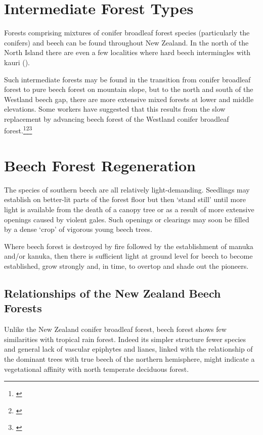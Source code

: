 \section{Intermediate Forest Types}

Forests comprising mixtures of conifer broadleaf forest species (particularly the conifers) and beech can be found throughout New Zealand.
In the north of the North Island there are even a few localities where hard beech intermingles with kauri ().

Such intermediate forests may be found in the transition from conifer broadleaf forest to pure beech forest on mountain slope, but to the north and south of the Westland beech gap, there are more extensive mixed forests at lower and middle elevations.
Some workers have suggested that this results from the slow replacement by advancing beech forest of the Westland conifer broadleaf forest.\footnote{\cite{holloway1954forests}}\footnote{\cite{wardle1964facets}}\footnote{\cite{wardle1980ecology}}

\section{Beech Forest Regeneration}

The species of southern beech are all relatively light-demanding.
Seedlings may establish on better-lit parts of the forest floor but then `stand still' until more light is available from the death of a canopy tree or as a result of more extensive openings caused by violent gales.
Such openings or clearings may soon be filled by a dense `crop' of vigorous young beech trees.

Where beech forest is destroyed by fire followed by the establishment of manuka and/or kanuka, then there is sufficient light at ground level for beech to become established, grow strongly and, in time, to overtop and shade out the pioneers.

\subsection{Relationships of the New Zealand Beech Forests}

Unlike the New Zealand conifer broadleaf forest, beech forest shows few similarities with tropical rain forest.
Indeed its simpler structure fewer species and general lack of vascular epiphytes and lianes, linked with the relationship of the dominant trees with true beech of the northern hemisphere, might indicate a vegetational affinity with north temperate deciduous forest.

